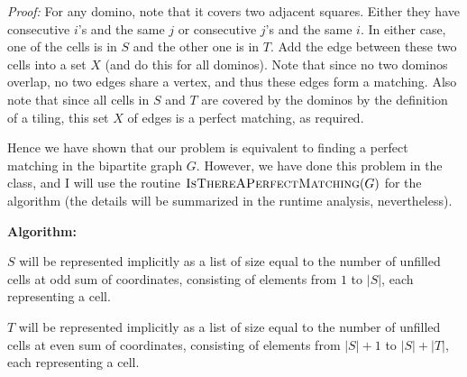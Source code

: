\documentclass[answers]{exam}
\begin{document}
\begin{questions}
\begin{solution}
        \textit{Proof:} For any domino, note that it covers two adjacent squares. Either they have consecutive $i$'s and the same $j$ or consecutive $j$'s and the same $i$. In either case, one of the
        cells is in $S$ and the other one is in $T$. Add the edge between these two cells into a set $X$ (and do this for all dominos). Note that since no two dominos overlap, no two edges share a
        vertex, and thus these edges form a matching. Also note that since all cells in $S$ and $T$ are covered by the dominos by the definition of a tiling, this set $X$ of edges is a perfect matching, as required.

Hence we have shown that our problem is equivalent to finding a perfect matching in the bipartite graph $G$. However, we have done this problem in the class, and I will use the routine
        $\textsc{IsThereAPerfectMatching}(G)$ for the algorithm (the details will be summarized in the runtime analysis, nevertheless).

        \textbf{Algorithm:}

        $S$ will be represented implicitly as a list of size equal to the number of unfilled cells at odd sum of coordinates, consisting of elements from $1$ to $|S|$, each representing a cell.
        
        $T$ will be represented implicitly as a list of size equal to the number of unfilled cells at even sum of coordinates, consisting of elements from $|S| + 1$ to $|S| + |T|$, each representing a
        cell.
        

\end{solution}
\end{questions}
\end{document}

